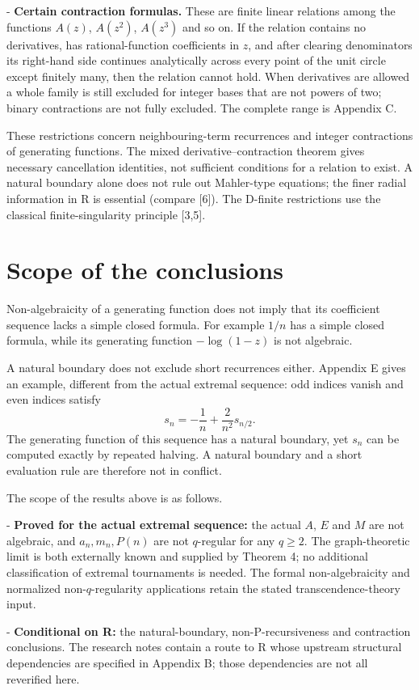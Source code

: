 \documentclass[11pt]{article}
\begin{document}
- \textbf{Certain contraction formulas.} These are finite linear relations among the functions $A(z)$, $A(z^2)$, $A(z^3)$ and so on. If the relation contains no derivatives, has rational-function coefficients in $z$, and after clearing denominators its right-hand side continues analytically across every point of the unit circle except finitely many, then the relation cannot hold. When derivatives are allowed a whole family is still excluded for integer bases that are not powers of two; binary contractions are not fully excluded. The complete range is Appendix C.

These restrictions concern neighbouring-term recurrences and integer contractions of generating functions. The mixed derivative--contraction theorem gives necessary cancellation identities, not sufficient conditions for a relation to exist. A natural boundary alone does not rule out Mahler-type equations; the finer radial information in R is essential (compare [6]). The D-finite restrictions use the classical finite-singularity principle [3,5].

\section{Scope of the conclusions}
Non-algebraicity of a generating function does not imply that its coefficient sequence lacks a simple closed formula. For example $1/n$ has a simple closed formula, while its generating function $-\log(1-z)$ is not algebraic.

A natural boundary does not exclude short recurrences either. Appendix E gives an example, different from the actual extremal sequence: odd indices vanish and even indices satisfy
\[
s_n=-\frac1n+\frac{2}{n^2}s_{n/2}.
\]
The generating function of this sequence has a natural boundary, yet $s_n$ can be computed exactly by repeated halving. A natural boundary and a short evaluation rule are therefore not in conflict.

The scope of the results above is as follows.

- \textbf{Proved for the actual extremal sequence:} the actual $A$, $E$ and $M$ are not algebraic, and $a_n,m_n,P(n)$ are not $q$-regular for any $q\ge2$. The graph-theoretic limit is both externally known and supplied by Theorem 4; no additional classification of extremal tournaments is needed. The formal non-algebraicity and normalized non-$q$-regularity applications retain the stated transcendence-theory input.

- \textbf{Conditional on R:} the natural-boundary, non-P-recursiveness and contraction conclusions. The research notes contain a route to R whose upstream structural dependencies are specified in Appendix B; those dependencies are not all reverified here.
\end{document}
